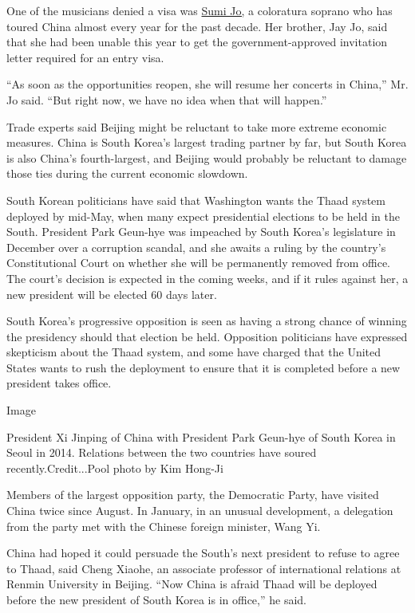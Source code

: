 One of the musicians denied a visa was
\href{https://www.nytimes.com/2017/01/23/world/asia/sumi-jo-soprano-maria-callas.html}{Sumi
Jo,} a coloratura soprano who has toured China almost every year for the
past decade. Her brother, Jay Jo, said that she had been unable this
year to get the government-approved invitation letter required for an
entry visa.

``As soon as the opportunities reopen, she will resume her concerts in
China,'' Mr. Jo said. ``But right now, we have no idea when that will
happen.''

Trade experts said Beijing might be reluctant to take more extreme
economic measures. China is South Korea's largest trading partner by
far, but South Korea is also China's fourth-largest, and Beijing would
probably be reluctant to damage those ties during the current economic
slowdown.

South Korean politicians have said that Washington wants the Thaad
system deployed by mid-May, when many expect presidential elections to
be held in the South. President Park Geun-hye was impeached by South
Korea's legislature in December over a corruption scandal, and she
awaits a ruling by the country's Constitutional Court on whether she
will be permanently removed from office. The court's decision is
expected in the coming weeks, and if it rules against her, a new
president will be elected 60 days later.

South Korea's progressive opposition is seen as having a strong chance
of winning the presidency should that election be held. Opposition
politicians have expressed skepticism about the Thaad system, and some
have charged that the United States wants to rush the deployment to
ensure that it is completed before a new president takes office.

Image

President Xi Jinping of China with President Park Geun-hye of South
Korea in Seoul in 2014. Relations between the two countries have soured
recently.Credit...Pool photo by Kim Hong-Ji

Members of the largest opposition party, the Democratic Party, have
visited China twice since August. In January, in an unusual development,
a delegation from the party met with the Chinese foreign minister, Wang
Yi.

China had hoped it could persuade the South's next president to refuse
to agree to Thaad, said Cheng Xiaohe, an associate professor of
international relations at Renmin University in Beijing. ``Now China is
afraid Thaad will be deployed before the new president of South Korea is
in office,'' he said.

